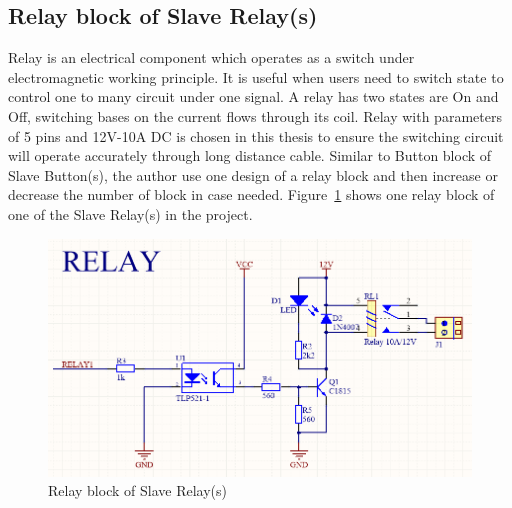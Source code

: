   \subsection{Relay block of Slave Relay(s)}
  Relay is an electrical component which operates as a switch under electromagnetic working principle. It is useful when users need to switch state to control one to many circuit under one signal. A relay has two states are On and Off, switching bases on the current flows through its coil. Relay with parameters of 5 pins and 12V-10A DC is chosen in this thesis to ensure the switching circuit will operate accurately through long distance cable. Similar to Button block of Slave Button(s), the author use one design of a relay block and then increase or decrease the number of block in case needed. Figure~\ref{fig:relayBlock} shows one relay block of one of the Slave Relay(s) in the project.
  \begin{figure}[!ht]
    \begin{center}
    \includegraphics[scale=0.65]{images/relay.png}
    \caption{Relay block of Slave Relay(s)}
    \label{fig:relayBlock}
    \end{center}
  \end{figure}
